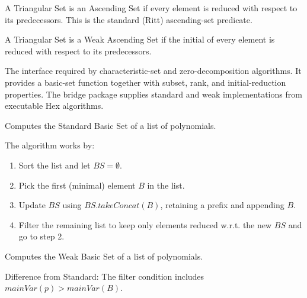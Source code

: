 \begin{definition}
    \label{def:IsAscendingSet}
    \leanok
    A Triangular Set is an Ascending Set if every element is reduced with respect to its predecessors.
    This is the standard (Ritt) ascending-set predicate.
\end{definition}


\begin{definition}
    \label{def:isWeakAscendingSet}
    \leanok
    A Triangular Set is a Weak Ascending Set if the initial of every element is reduced with respect to its predecessors.
\end{definition}

\begin{definition}
    \label{def:BasicSetSpec}
    \leanok
    The interface required by characteristic-set and zero-decomposition algorithms.
    It provides a basic-set function together with subset, rank, and initial-reduction properties.
    The bridge package supplies standard and weak implementations from executable Hex algorithms.
\end{definition}

\begin{definition}
    \label{def:Standard.basicSet}
    \leanok
    Computes the Standard Basic Set of a list of polynomials.

    The algorithm works by:
    \begin{enumerate}
        \item Sort the list and let $BS = \emptyset$.
        \item Pick the first (minimal) element $B$ in the list.
        \item Update $BS$ using $BS.takeConcat(B)$, retaining a prefix and appending $B$.
        \item Filter the remaining list to keep only elements reduced w.r.t. the new $BS$ and go to step 2.
    \end{enumerate}
\end{definition}

\begin{definition}
    \label{def:Weak.basicSet}
    \leanok
    Computes the Weak Basic Set of a list of polynomials.

    Difference from Standard: The filter condition includes $mainVar(p) > mainVar(B)$.
\end{definition}

